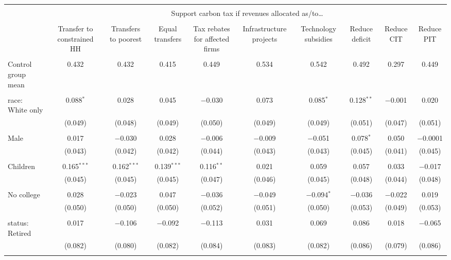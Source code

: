 
\begin{tabular}{@{\extracolsep{5pt}}lccccccccc} 
\\[-1.8ex]\hline 
\hline \\[-1.8ex] 
 & \multicolumn{9}{c}{Support carbon tax if revenues allocated as/to…} \\ 
\cline{2-10} 
\\[-1.8ex] & Transfer to constrained HH & Transfers to poorest & Equal transfers & Tax rebates for affected firms & Infrastructure projects & Technology subsidies & Reduce deficit & Reduce CIT & Reduce PIT \\ 
\hline \\[-1.8ex] 
 Control group mean & 0.432 & 0.432 & 0.415 & 0.449 & 0.534 & 0.542 & 0.492 & 0.297 & 0.449  \\ \hline \\[-1.8ex] race: White only & 0.088$^{*}$ & 0.028 & 0.045 & $-$0.030 & 0.073 & 0.085$^{*}$ & 0.128$^{**}$ & $-$0.001 & 0.020 \\ 
  & (0.049) & (0.048) & (0.049) & (0.050) & (0.049) & (0.049) & (0.051) & (0.047) & (0.051) \\ 
  & & & & & & & & & \\ 
 Male & 0.017 & $-$0.030 & 0.028 & $-$0.006 & $-$0.009 & $-$0.051 & 0.078$^{*}$ & 0.050 & $-$0.0001 \\ 
  & (0.043) & (0.042) & (0.042) & (0.044) & (0.043) & (0.043) & (0.045) & (0.041) & (0.045) \\ 
  & & & & & & & & & \\ 
 Children & 0.165$^{***}$ & 0.162$^{***}$ & 0.139$^{***}$ & 0.116$^{**}$ & 0.021 & 0.059 & 0.057 & 0.033 & $-$0.017 \\ 
  & (0.045) & (0.045) & (0.045) & (0.047) & (0.046) & (0.045) & (0.048) & (0.044) & (0.048) \\ 
  & & & & & & & & & \\ 
 No college & 0.028 & $-$0.023 & 0.047 & $-$0.036 & $-$0.049 & $-$0.094$^{*}$ & $-$0.036 & $-$0.022 & 0.019 \\ 
  & (0.050) & (0.050) & (0.050) & (0.052) & (0.051) & (0.050) & (0.053) & (0.049) & (0.053) \\ 
  & & & & & & & & & \\ 
 status: Retired & 0.017 & $-$0.106 & $-$0.092 & $-$0.113 & 0.031 & 0.069 & 0.086 & 0.018 & $-$0.065 \\ 
  & (0.082) & (0.080) & (0.082) & (0.084) & (0.083) & (0.082) & (0.086) & (0.079) & (0.086) \\ 
  & & & & & & & & & \\ 

\end{tabular}
